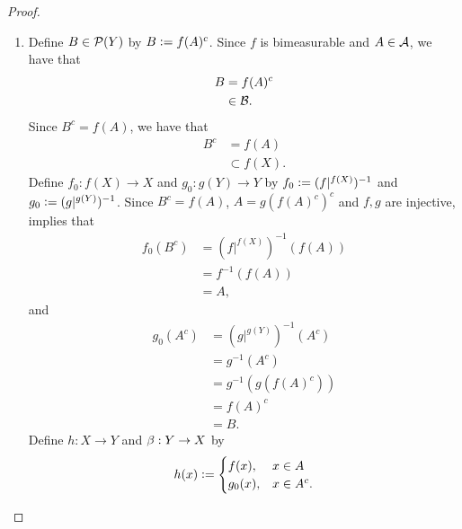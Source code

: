 \documentclass{book}
\begin{document}
\begin{proof}
\begin{enumerate}
\begin{enumerate}
\begin{align*}
					& = \bigcup\limits_{n \in \N} A_{n+1} \\
					& = \bigg[ \bigcup\limits_{n \in \N} A_{n+1} \bigg] \cup \varnothing \\
					& = \bigg[ \bigcup\limits_{n \in \N} A_{n+1} \bigg] \cup A_1 \\
					& = \bigcup\limits_{n \in \N} A_n \\
					& = A.
				\end{align*}
				Since $A^c = g(f(A)^c)$, we have that 
				\begin{align*}
					A^c 
					& = g(f(A)^c) \\
					& \subset g(Y).
				\end{align*}
			\end{enumerate}
			\item 
			Define $B \in \mathcal{P}(Y)$ by $B \vcentcolon= f(A)^c$. Since $f$ is bimeasurable and $A \in \mathcal{A}$, we have that  
			\begin{align*}
				B
				& = f(A)^c \\
				& \in \mathcal{B}. 
			\end{align*}
			Since $B^c = f(A)$, we have that
			\begin{align*}
				B^c 
				& = f(A) \\
				& \subset f(X).
			\end{align*}
			Define $f_0: f(X) \rightarrow X$ and $g_0:g(Y) \rightarrow Y$ by $f_0 \vcentcolon= (f|^{f(X)})^{-1}$ and $g_0 \vcentcolon= (g|^{g(Y)})^{-1}$. Since $B^c = f(A)$, $A = g(f(A)^c)^c$ and $f, g$ are injective,  implies that 
			\begin{align*}
				f_0(B^c) 
				& = (f|^{f(X)})^{-1}(f(A)) \\
				& = f^{-1}(f(A)) \\
				& = A,
			\end{align*}
			and
			\begin{align*}
				g_0(A^c)
				& = (g|^{g(Y)})^{-1}(A^c) \\
				& = g^{-1}(A^c) \\
				& = g^{-1}(g(f(A)^c)) \\
				& = f(A)^c \\
				& = B.
			\end{align*}
			Define $h:X \rightarrow Y$ and $\beta: Y \rightarrow X$ by 
			\[
			h(x) \vcentcolon= 
			\begin{cases}
				f(x), & x \in A \\
				g_0(x),  & x \in A^c.
			\end{cases}
\]
\end{enumerate}
\end{proof}
\end{document}
